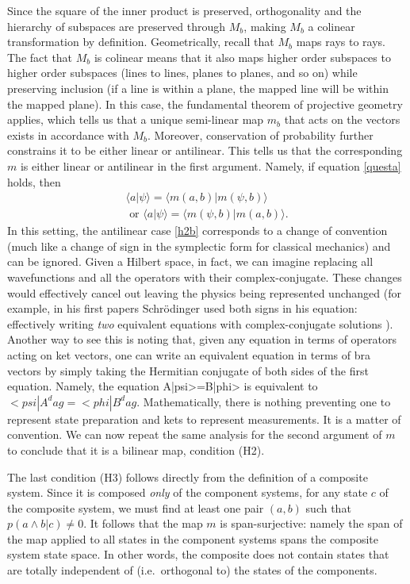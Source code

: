 \documentclass[aps,prl,amsmath,amssymb,twocolumn,nofootinbib]{revtex4}
\theoremstyle{plain}
\theoremstyle{definition}
\theoremstyle{remark}
\def\>{\rangle}
\def\<{\langle}
\def\labell#1{\label{#1}}
\begin{document}
	Since the square of the inner product is preserved, orthogonality and
	the hierarchy of subspaces are preserved through $M_b$, making $M_b$ a
	colinear transformation by definition. Geometrically, recall that $M_b$ maps rays to rays. The fact that $M_b$ is colinear means that it also maps higher order subspaces to higher order subspaces (lines to lines, planes to planes, and so on) while preserving inclusion (if a line is within a plane, the mapped line will be within the mapped plane). In this case, the fundamental
	theorem of projective geometry \cite{fun} applies, which tells us that
	a unique semi-linear map $m_b$ that acts on the vectors exists in accordance with $M_b$.
	Moreover, conservation of probability further constrains it to be
	either linear or antilinear. This tells us that the corresponding $m$
	is either linear or antilinear in the first argument. Namely, if equation
	\eqref{questa} holds, then
	\begin{align}
	\<a|\psi\>=\<m(a,b)|m(\psi,b)\>\labell{h2}\;
	\\\mbox{ or }
	\<a|\psi\>=\<m(\psi,b)|m(a,b)\> \labell{h2b}.
	\end{align}
	In this setting, the antilinear case \eqref{h2b} corresponds to a change of convention (much like a change of sign in the symplectic form for classical mechanics) and can be ignored. Given a Hilbert space, in fact, we can imagine replacing all wavefunctions and all the operators with their complex-conjugate. These changes would effectively cancel out leaving the physics being represented unchanged  (for example, in his first papers
	Schr\"odinger used both signs in his equation: effectively writing
	{\em two} equivalent equations with complex-conjugate solutions
	\cite{sch}). Another way to see this is noting that, given any equation 
	in terms of operators acting on ket vectors, one can write an
	equivalent equation in terms of bra vectors by simply taking the
	Hermitian conjugate of both sides of the first equation. Namely, the
	equation A|psi>=B|phi> is equivalent to $<psi|A^dag=<phi|B^dag$. Mathematically, there is nothing preventing one to represent state preparation and kets to represent measurements. It is a matter of convention. We can now repeat the same analysis for the second
	argument of $m$ to conclude that it is a bilinear map, condition (H2).
	
	The last condition (H3) follows directly from the definition of a
	composite system. Since it is composed {\em only} of the component
	systems, for any state $c$ of the composite system, we must find at least one pair $(a, b)$ such that $p(a\wedge b | c)\neq 0$. It follows that the map $m$ is span-surjective: namely the
	span of the map applied to all states in the component systems spans
	the composite system state space. In other words, the composite does
	not contain states that are totally independent of (i.e.~orthogonal
	to) the states of the components.
	
\end{document}
